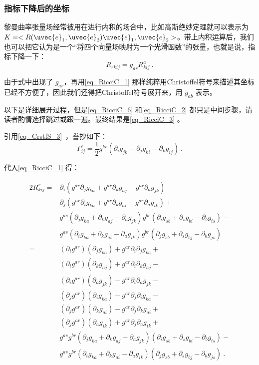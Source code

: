 \subsubsection{指标下降后的坐标}

黎曼曲率张量场经常被用在进行内积的场合中，比如高斯绝妙定理就可以表示为 $K=<R(\uvec{e}_1, \uvec{e}_2)\uvec{e}_1, \uvec{e}_2>$。带上内积运算后，我们也可以把它认为是一个“将四个向量场映射为一个光滑函数”的张量，也就是说，指标下降一下：
\begin{equation}
R_{rkij}=g_{ar}R^a_{kij}~.
\end{equation}

由于式中出现了 $g_{ar}$，再用\autoref{eq_RicciC_1} 那样纯粹用Christoffel符号来描述其坐标已经不方便了，因此我们还得把Christoffel符号展开来，用 $g_{ab}$ 表示。

以下是详细展开过程，但是\autoref{eq_RicciC_6} 和\autoref{eq_RicciC_2} 都只是中间步骤，请读者酌情选择跳过或跟一遍。最终结果是\autoref{eq_RicciC_3} 。

引用\autoref{eq_CrstfS_3}~，誊抄如下：
\begin{equation}
\Gamma^{r}_{ij}=\frac{1}{2}g^{kr}(\partial_ig_{jk}+\partial_jg_{ki}-\partial_kg_{ij})~.
\end{equation}

代入\autoref{eq_RicciC_1} 得：

\begin{equation}\label{eq_RicciC_6}
\begin{aligned}
2R^r_{kij}={}&\partial_i(g^{ar}\partial_jg_{ka}+g^{ar}\partial_kg_{aj}-g^{ar}\partial_ag_{jk})-\\
&\partial_j(g^{ar}\partial_ig_{ka}+g^{ar}\partial_kg_{ai}-g^{ar}\partial_ag_{ik})+\\
&g^{as}(\partial_jg_{ka}+\partial_kg_{aj}-\partial_ag_{jk})g^{br}(\partial_ig_{sb}+\partial_sg_{bi}-\partial_bg_{is})-\\
&g^{as}(\partial_ig_{ka}+\partial_kg_{ai}-\partial_ag_{ik})g^{br}(\partial_jg_{sb}+\partial_sg_{bj}-\partial_bg_{js})\\
={}&(\partial_ig^{ar})(\partial_jg_{ka})+g^{ar}\partial_i\partial_jg_{ka}+\\
&(\partial_ig^{ar})(\partial_kg_{aj})+g^{ar}\partial_i\partial_kg_{aj}-\\
&(\partial_ig^{ar})(\partial_ag_{jk})-g^{ar}\partial_i\partial_ag_{jk}-\\%
&(\partial_jg^{ar})(\partial_ig_{ka})-g^{ar}\partial_j\partial_ig_{ka}-\\
&(\partial_jg^{ar})(\partial_kg_{ai})-g^{ar}\partial_j\partial_kg_{ai}+\\
&(\partial_jg^{ar})(\partial_ag_{ik})+g^{ar}\partial_j\partial_ag_{ik}+\\%
&g^{as}g^{br}(\partial_jg_{ka}+\partial_kg_{aj}-\partial_ag_{jk})(\partial_ig_{sb}+\partial_sg_{bi}-\partial_bg_{is})-\\
&g^{as}g^{br}(\partial_ig_{ka}+\partial_kg_{ai}-\partial_ag_{ik})(\partial_jg_{sb}+\partial_sg_{bj}-\partial_bg_{js})~.
\end{aligned}
\end{equation}

